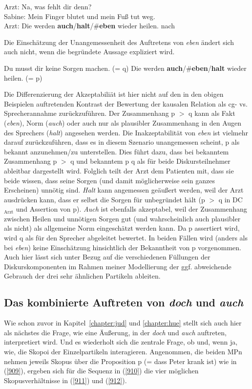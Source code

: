 {\begin{exe}
	\ex\label{907}
	Arzt: Na, was fehlt dir denn?\\
	Sabine: Mein Finger blutet und mein Fuß tut weg.\\
	Arzt: Die werden \textbf{auch}/\textbf{halt}/\#\textbf{eben} wieder heilen.	
	\hfill\hbox {nach \citet[118]{Bublitz1978}}
\end{exe}
Die Einschätzung der Unangemessenheit des Auftretens von \textit{eben} ändert sich auch nicht, wenn die begründete Aussage expliziert wird.

\begin{exe}
	\ex\label{908}
	Du musst dir keine Sorgen machen. (= q) Die werden \textbf{auch}/\#\textbf{eben}/\textbf{halt} wieder heilen. (= p)
\end{exe}	
Die Differenzierung der Akzeptabiliät ist hier nicht auf den in den obigen Beispielen auftretenden Kontrast der Bewertung der kausalen Relation als cg- vs. Sprecherannahme zurückzuführen. Der Zusammenhang p $>$ q kann als Fakt (\textit{eben}), Norm (\textit{auch}) oder auch nur als plausibler Zusammenhang in den Augen des Sprechers (\textit{halt}) angesehen werden. Die Inakzeptabilität von \textit{eben} ist vielmehr darauf zurückzuführen, dass es in diesem Szenario unangemessen scheint, p als bekannt anzunehmen/zu unterstellen. Dies führt dazu, dass bei bekanntem Zusammenhang p $>$ q und bekanntem p q als für beide Diskursteilnehmer ableitbar dargestellt wird. Folglich teilt der Arzt dem Patienten mit, dass sie beide wissen, dass seine Sorgen (und damit möglicherweise sein ganzes Erscheinen) unnötig sind. \textit{Halt} kann angemessen geäußert werden, weil der Arzt ausdrücken kann, dass er selbst die Sorgen für unbegründet hält (p $>$ q in DC$_{\textrm{Arzt}}$ und Assertion von p). \textit{Auch} ist ebenfalls akzeptabel, weil der Zusammenhang zwischen Heilen und unnötigen Sorgen gut (und wahrscheinlich auch plausibler als nicht) als allgemeine Norm eingeschätzt werden kann. Da p assertiert wird, wird q als für den Sprecher abgeleitet bewertet. In beiden Fällen wird (anders als bei \textit{eben}) keine Einschätzung hinsichtlich der Bekanntheit von p vorgenommen. Auch hier lässt sich unter Bezug auf die verschiedenen Füllungen der Diskurskomponenten im Rahmen meiner Modellierung der ggf. abweichende Gebrauch der drei sehr ähnlichen Partikeln ableiten.

\subsection{Das kombinierte Auftreten von \textit{doch} und \textit{auch}}
Wie schon zuvor in Kapitel~\ref{chapter:jud} und \ref{chapter:hue} stellt sich auch hier als nächstes die Frage, wie eine Äußerung, in der \textit{doch} und \textit{auch} auftreten, interpretiert wird. Und es wiederholt sich die zentrale Frage, ob und, wenn ja, wie, die Skopoi  der Einzelpartikeln interagieren. Angenommen, die beiden MPn nehmen jeweils Skopus über die Proposition p (= dass Peter krank ist) wie in (\ref{909}), ergeben sich für die Sequenz in (\ref{910}) die vier möglichen Skopusverhältnisse in (\ref{911}) und (\ref{912}).

}

